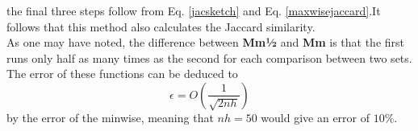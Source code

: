 \documentclass[../../main.tex]{subfiles}
\begin{document}
the final three steps follow from Eq. \ref{jacsketch} and Eq. \ref{maxwisejaccard}.It follows that this method also calculates the Jaccard similarity.\\

As one may have noted, the difference between \textbf{Mm½} and \textbf{Mm} is that the first runs only half as many times as the second for each comparison between two sets. The error of these functions can be deduced to
\begin{equation}\label{minmaxerror}
\epsilon = O\left(\frac{1}{\sqrt{2nh}}\right)
\end{equation}
by the error of the minwise, meaning that $nh=50$ would give an error of $10\%$.
\end{document}
